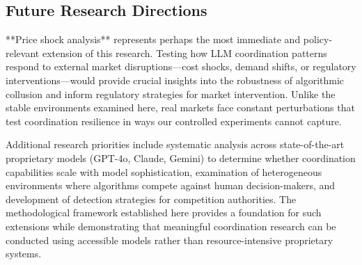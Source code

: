 \subsection{Future Research Directions}

**Price shock analysis** represents perhaps the most immediate and policy-relevant extension of this research. Testing how LLM coordination patterns respond to external market disruptions—cost shocks, demand shifts, or regulatory interventions—would provide crucial insights into the robustness of algorithmic collusion and inform regulatory strategies for market intervention. Unlike the stable environments examined here, real markets face constant perturbations that test coordination resilience in ways our controlled experiments cannot capture.

Additional research priorities include systematic analysis across state-of-the-art proprietary models (GPT-4o, Claude, Gemini) to determine whether coordination capabilities scale with model sophistication, examination of heterogeneous environments where algorithms compete against human decision-makers, and development of detection strategies for competition authorities. The methodological framework established here provides a foundation for such extensions while demonstrating that meaningful coordination research can be conducted using accessible models rather than resource-intensive proprietary systems.
